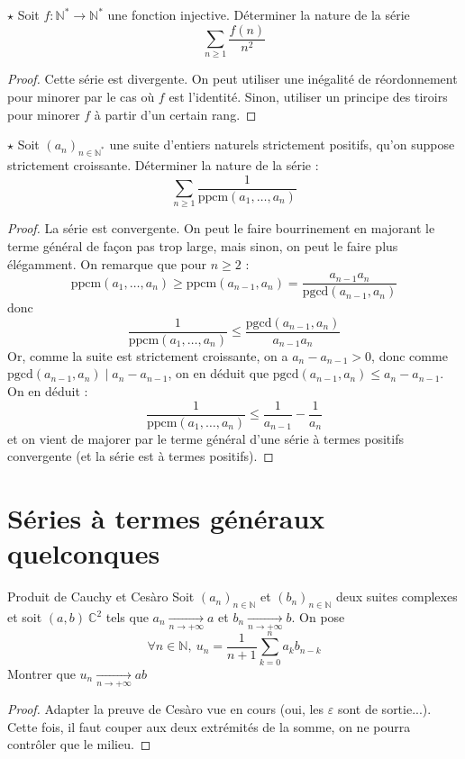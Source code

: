\documentclass[french,a4paper]{article}
\newcommand{\N}{\mathbb{N}}
\newcommand{\C}{\mathbb{C}}
\newcommand{\st}{^*}
\theoremstyle{plain}
\theoremstyle{definition}
\theoremstyle{remark}
\begin{document}
\begin{ex}[Morlot]{$\star$}
	Soit $f:\N\st\to\N\st$ une fonction injective. Déterminer la nature de la série $$\sum_{n\geqslant 1}\frac{f(n)}{n^2}$$
\end{ex}

\begin{proof}
	Cette série est divergente. On peut utiliser une inégalité de réordonnement pour minorer par le cas où $f$ est l'identité. Sinon, utiliser un principe des tiroirs pour minorer $f$ à partir d'un certain rang. 
\end{proof}

\begin{ex}[X]{$\star$}
	Soit $(a_n)_{n\in\N\st}$ une suite d'entiers naturels strictement positifs, qu'on suppose strictement croissante. Déterminer la nature de la série : $$\sum_{n\geq 1}\frac{1}{\text{ppcm}(a_1,\ldots,a_n)}$$
\end{ex}
\begin{proof}
	La série est convergente. On peut le faire bourrinement en majorant le terme général de façon pas trop large, mais sinon, on peut le faire plus élégamment. On remarque que pour $n\geqslant 2$ : $$\text{ppcm}(a_1,\ldots,a_n)\geqslant\text{ppcm}(a_{n-1},a_n)=\frac{a_{n-1}a_n}{\text{pgcd}(a_{n-1},a_n)}$$ donc $$\frac{1}{\text{ppcm}(a_1,\ldots,a_n)}\leqslant\frac{\text{pgcd}(a_{n-1},a_n)}{a_{n-1}a_n}$$ Or, comme la suite est strictement croissante, on a $a_{n}-a_{n-1}>0$, donc comme $\text{pgcd}(a_{n-1},a_n)\mid a_n-a_{n-1}$, on en déduit que $\text{pgcd}(a_{n-1},a_n)\leqslant a_n-a_{n-1}$. On en déduit : $$\frac{1}{\text{ppcm}(a_1,\ldots,a_n)}\leqslant\frac{1}{a_{n-1}}-\frac{1}{a_n}$$ et on vient de majorer par le terme général d'une série à termes positifs convergente (et la série est à termes positifs).
\end{proof}

\section{Séries à termes généraux quelconques}

\begin{ex}{Produit de Cauchy et Cesàro}
	Soit $(a_n)_{n \in\N}$ et $(b_n)_{n \in\N}$ deux suites complexes et soit $(a,b) \ \C^2$ tels que $a_n \underset{n \longrightarrow + \infty}{\longrightarrow} a $ et $b_n \underset{n \longrightarrow + \infty}{\longrightarrow} b $. On pose $$\forall n \in \N, \ u_n = \frac{1}{n+1}\sum_{k=0}^{n}a_k b_{n-k} $$ Montrer que $u_n \xrightarrow[n\to+\infty]{} ab$
\end{ex}
\begin{proof}
	Adapter la preuve de Cesàro vue en cours (oui, les $\varepsilon$ sont de sortie...). Cette fois, il faut couper aux deux extrémités de la somme, on ne pourra contrôler que le milieu.
\end{proof}
\end{document}
